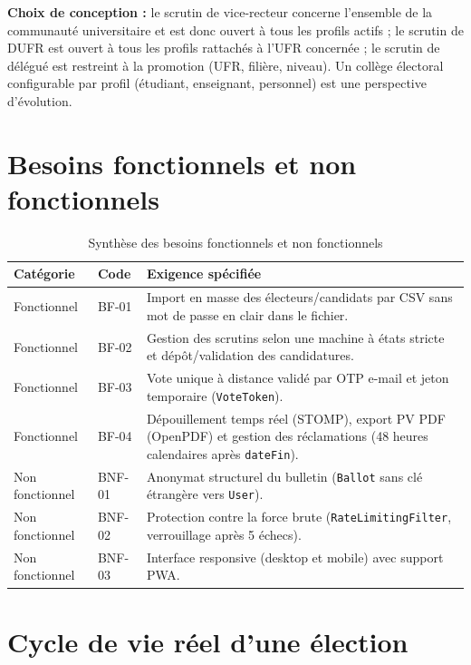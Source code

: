 \noindent\textbf{Choix de conception :} le scrutin de vice-recteur concerne l'ensemble de la communauté universitaire et est donc ouvert à tous les profils actifs ; le scrutin de DUFR est ouvert à tous les profils rattachés à l'UFR concernée ; le scrutin de délégué est restreint à la promotion (UFR, filière, niveau). Un collège électoral configurable par profil (étudiant, enseignant, personnel) est une perspective d'évolution.

\section{Besoins fonctionnels et non fonctionnels}

\begin{table}[H]
\centering
\caption{Synthèse des besoins fonctionnels et non fonctionnels}
\label{tab:besoins}
\small
\begin{tabularx}{\textwidth}{@{}llX@{}}
\toprule
\rowcolor{uaszlight}
\textbf{Catégorie} & \textbf{Code} & \textbf{Exigence spécifiée} \\
\midrule
Fonctionnel & BF-01 & Import en masse des électeurs/candidats par CSV sans mot de passe en clair dans le fichier. \\
Fonctionnel & BF-02 & Gestion des scrutins selon une machine à états stricte et dépôt/validation des candidatures. \\
Fonctionnel & BF-03 & Vote unique à distance validé par OTP e-mail et jeton temporaire (\texttt{VoteToken}). \\
Fonctionnel & BF-04 & Dépouillement temps réel (STOMP), export PV PDF (OpenPDF) et gestion des réclamations (48 heures calendaires après \texttt{dateFin}). \\
Non fonctionnel & BNF-01 & Anonymat structurel du bulletin (\texttt{Ballot} sans clé étrangère vers \texttt{User}). \\
Non fonctionnel & BNF-02 & Protection contre la force brute (\texttt{RateLimitingFilter}, verrouillage après 5 échecs). \\
Non fonctionnel & BNF-03 & Interface responsive (desktop et mobile) avec support PWA. \\
\bottomrule
\end{tabularx}
\end{table}

\section{Cycle de vie réel d'une élection}

